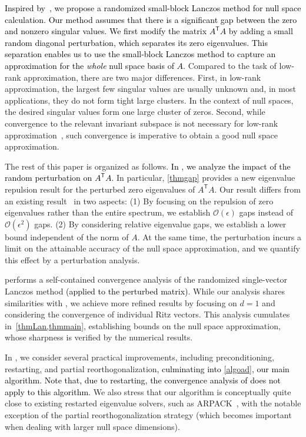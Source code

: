 \documentclass{siamart190516}
\newcommand{\Ttran}{\mathsf{T}}
\newcommand{\order}{\mathcal{O}}
\newcommand{\edit}[1]{\textcolor{black}{#1}} %
\newcommand{\redit}[1]{\textcolor{black}{#1}} %
\begin{document}
\edit{Inspired by~\cite{Meyer2023}, we propose a randomized small-block Lanczos method for null space calculation. 
Our method assumes that there is a significant gap between the zero and nonzero singular values. We first modify the matrix $A^{\Ttran}A$ by adding a small random diagonal perturbation, which separates its zero eigenvalues. This separation enables us to use the small-block Lanczos method to capture an approximation for the \emph{whole} null space basis of $A$.} 
Compared to the task of low-rank approximation, there are two major differences. First, in low-rank approximation, the largest few singular values are usually unknown and, in most applications, they do not form tight large clusters. In the context of null spaces, the desired singular values form one large cluster of zeros. Second, while convergence to the relevant invariant subspace is not necessary for low-rank approximation~\cite{Drineas2019}, such convergence is imperative to obtain a good null space approximation.

The rest of this paper is organized as follows.
\edit{In , we analyze the impact of the random perturbation on $A^{\Ttran}A$.} 
    In particular, \cref{thmgap} provides a new eigenvalue repulsion result for the perturbed zero eigenvalues of $A^{\Ttran}A$. Our result differs from an existing result~\cite[Lemma 12]{Meyer2023} in two aspects: (1) By focusing on the repulsion of zero eigenvalues rather than the entire spectrum, we establish $\order(\epsilon)$ gaps instead of $\order(\epsilon^{2})$ gaps. (2) By considering relative eigenvalue gaps, we establish \edit{a} lower bound independent of the norm of $A$. At the same time, the perturbation incurs a limit on the attainable accuracy of the null space approximation, and we quantify this effect by a perturbation analysis.

     performs a self-contained convergence analysis of the randomized single-vector Lanczos method \edit{(applied to the perturbed matrix)}. 
    While our analysis shares similarities with \cite{Meyer2023}, we achieve more refined results by focusing on $d = 1$ 
    and considering the convergence of individual Ritz vectors. This analysis cumulates in~\cref{thmLan,thmmain}, establishing bounds on the null space approximation, whose sharpness is verified by the numerical results. 

    In , we consider several practical improvements, 
    including preconditioning, restarting, and partial reorthogonalization\redit{, culminating into \cref{algoad}, our main algorithm. Note that, due to restarting, the convergence analysis of
    \Cref{Sec:ConvAnal} does not apply to this algorithm.} 
    We also stress that our algorithm is conceptually quite close to existing restarted eigenvalue solvers, such as ARPACK~\cite{Lehoucq1998}, with the notable exception of the partial reorthogonalization strategy (which becomes important when dealing with larger null space dimensions). 
    
\end{document}
